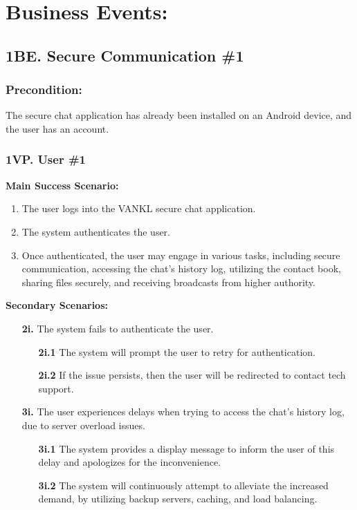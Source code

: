 \documentclass[]{article}
\begin{document}
\section*{Business Events:}
\subsection*{1BE. Secure Communication \#1}
\subsubsection*{Precondition:} The secure chat application has already been installed on an Android device, and the user has an account.
\subsubsection*{1VP. User \#1}
\textbf{Main Success Scenario:}
\begin{enumerate}
	\item The user logs into the VANKL secure chat application.
	\item The system authenticates the user.
	\item Once authenticated, the user may engage in various tasks, including secure communication, accessing the chat’s history log, utilizing the contact book, sharing files securely, and receiving broadcasts from higher authority.
\end{enumerate}
\textbf{Secondary Scenarios:}
\begin{enumerate}
	\item[\textbf{2i.}] The system fails to authenticate the user.
		\begin{enumerate}
			\item[\textbf{2i.1}] The system will prompt the user to retry for authentication.
			\item[\textbf{2i.2}] If the issue persists, then the user will be redirected to contact tech support.
		\end{enumerate}
	\item[\textbf{3i.}] The user experiences delays when trying to access the chat’s history log, due to server overload issues.
		\begin{enumerate}
			\item[\textbf{3i.1}] The system provides a display message to inform the user of this delay and apologizes for the inconvenience.
			\item[\textbf{3i.2}] The system will continuously attempt to alleviate the increased demand, by utilizing backup servers, caching, and load balancing.
		\end{enumerate}
\end{enumerate}
\end{document}

